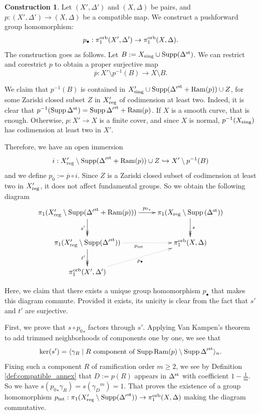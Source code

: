 \documentclass{amsart}
\theoremstyle{definition}
\newtheorem{construction}[theorem]{Construction}
\theoremstyle{remark}
\numberwithin{equation}{section}
\begin{document}
\begin{construction}\label{con:pushforward}  
 Let $(X',\Delta')$ and $(X,\Delta)$ be pairs, and $p:(X',\Delta') \to (X,\Delta)$ be a compatible map.
We construct a pushforward group homomorphism:
$$p_{\bullet}:\pi_1^{\rm orb}(X',\Delta')\to\pi_1^{\rm orb}(X,\Delta).$$
The construction goes as follows.
Let $B:=X_{\rm sing}\cup {\rm Supp}(\Delta^{\rm st})$.
We can restrict and corestrict $p$ to obtain a proper surjective map
$$\overline{p}:X'\setminus p^{-1}(B)
    \to X\setminus B.$$

We claim that $p^{-1}(B)$ is contained in $X'_{\rm sing}\cup{\rm Supp}({\Delta'}^{\rm st} + {\rm Ram}(p))\cup Z$, for some Zariski closed subset $Z$ in $X'_{\rm reg}$ of codimension at least two. Indeed, it is clear that $p^{-1}({\rm Supp}\,\Delta^{\rm st})={\rm Supp}\,{\Delta'}^{\rm st} + {\rm Ram}(p)$. If $X$ is a smooth curve, that is enough. Otherwise, $p:X'\to X$ is a finite cover, and since $X$ is normal, $p^{-1}(X_{\rm sing})$ has codimension at least two in $X'$.

Therefore, we have an open immersion 
    $$i:X'_{\rm reg}\setminus {\rm Supp}({\Delta'}^{\rm st}+{\rm Ram}(p))\cup Z \hookrightarrow X'\setminus p^{-1}(B)$$
    and we define $p_0:=\overline{p}\circ i.$
Since $Z$ is a Zariski closed subset of codimension at least two in $X'_{\rm reg}$, it does not affect fundamental groups. So we obtain the following diagram
    $$\xymatrix{
    \pi_1(X'_{\rm reg}\setminus {\rm Supp}({\Delta'}^{\rm st}+{\rm Ram}(p))) \ar@{->>}[d]_{s'} \ar[r]^-{{p_0}_*} 
    & \pi_1(X_{\rm reg}\setminus {\rm Supp}\left(\Delta^{\rm st}\right)) \ar@{->>}[d]^s
    \\
    \pi_1(X'_{\rm reg}\setminus {\rm Supp}({\Delta'}^{\rm st})) 
    \ar@{->>}[d]_{t'}
    \ar@{.>}[r]_{p_{\rm int}} 
    & \pi_1^{\rm orb}(X,\Delta)
    \\
    \pi_1^{\rm orb}(X',\Delta') 
    \ar@{.>}[ur]_{p_{\bullet}}
    & 
    }
    $$

Here, we claim that there exists a unique group homomorphism $p_{\bullet}$ that makes this diagram commute. Provided it exists, its unicity is clear from the fact that $s'$ and $t'$ are surjective.

First, we prove that $s\circ {p_0}_*$ factors through $s'$. Applying Van Kampen's theorem to add trimmed neighborhoods of components one by one, we see that
$$\ker(s')=\langle \gamma_R\mid R\mbox{ component of }{\rm Supp}\,{\rm Ram}(p)\setminus{\rm Supp}\,{\Delta'}^{\rm st}\rangle_n.$$
Fixing such a component $R$ of ramification order $m\ge 2$, we see by Definition \ref{def:compatible_annex} that $D:=p(R)$ appears in $\Delta^{\rm st}$ with coefficient $1-\frac{1}{m}$. So we have 
$s({p_0}_*\gamma_R)=s({\gamma_D}^m)=1.$
That proves the existence of a group homomorphism
$p_{\rm int}:\pi_1(X'_{\rm reg}\setminus {\rm Supp}({\Delta'}^{\rm st}))\to \pi_1^{\rm orb}(X,\Delta)$
making the diagram commutative.


\end{construction}
\end{document}
